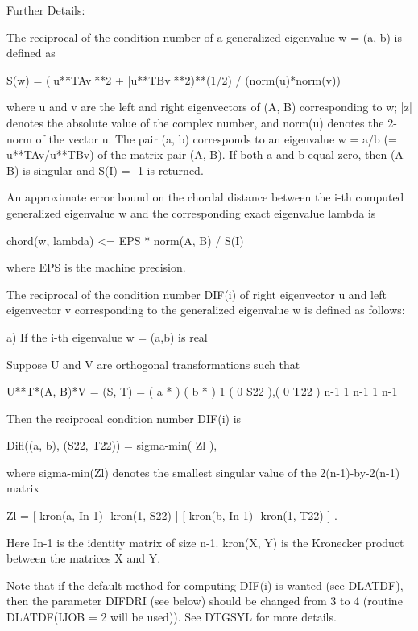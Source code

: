 \begin{DoxyParagraph}{Further Details\+: }
\begin{DoxyVerb}  The reciprocal of the condition number of a generalized eigenvalue
  w = (a, b) is defined as

       S(w) = (|u**TAv|**2 + |u**TBv|**2)**(1/2) / (norm(u)*norm(v))

  where u and v are the left and right eigenvectors of (A, B)
  corresponding to w; |z| denotes the absolute value of the complex
  number, and norm(u) denotes the 2-norm of the vector u.
  The pair (a, b) corresponds to an eigenvalue w = a/b (= u**TAv/u**TBv)
  of the matrix pair (A, B). If both a and b equal zero, then (A B) is
  singular and S(I) = -1 is returned.

  An approximate error bound on the chordal distance between the i-th
  computed generalized eigenvalue w and the corresponding exact
  eigenvalue lambda is

       chord(w, lambda) <= EPS * norm(A, B) / S(I)

  where EPS is the machine precision.

  The reciprocal of the condition number DIF(i) of right eigenvector u
  and left eigenvector v corresponding to the generalized eigenvalue w
  is defined as follows:

  a) If the i-th eigenvalue w = (a,b) is real

     Suppose U and V are orthogonal transformations such that

              U**T*(A, B)*V  = (S, T) = ( a   *  ) ( b  *  )  1
                                        ( 0  S22 ),( 0 T22 )  n-1
                                          1  n-1     1 n-1

     Then the reciprocal condition number DIF(i) is

                Difl((a, b), (S22, T22)) = sigma-min( Zl ),

     where sigma-min(Zl) denotes the smallest singular value of the
     2(n-1)-by-2(n-1) matrix

         Zl = [ kron(a, In-1)  -kron(1, S22) ]
              [ kron(b, In-1)  -kron(1, T22) ] .

     Here In-1 is the identity matrix of size n-1. kron(X, Y) is the
     Kronecker product between the matrices X and Y.

     Note that if the default method for computing DIF(i) is wanted
     (see DLATDF), then the parameter DIFDRI (see below) should be
     changed from 3 to 4 (routine DLATDF(IJOB = 2 will be used)).
     See DTGSYL for more details.


\end{DoxyVerb}
\end{DoxyParagraph}
